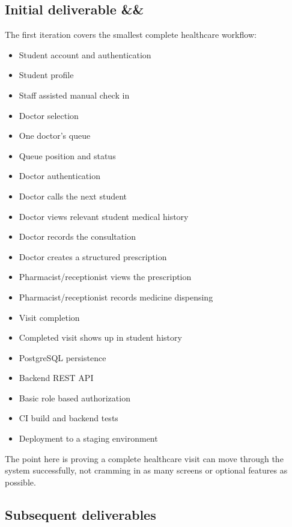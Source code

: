 \documentclass[11pt,a4paper]{article}
\newcommand{\BvrHint}[1]{%
  \ifx&#1&%
  \else
    {\normalfont\normalsize\itshape\hfill #1}%
  \fi}
\begin{document}
\subsection{Initial deliverable \BvrHint{}}

The first iteration covers the smallest complete healthcare workflow:

\begin{itemize}
    \item Student account and authentication
    \item Student profile
    \item Staff assisted manual check in
    \item Doctor selection
    \item One doctor's queue
    \item Queue position and status
    \item Doctor authentication
    \item Doctor calls the next student
    \item Doctor views relevant student medical history
    \item Doctor records the consultation
    \item Doctor creates a structured prescription
    \item Pharmacist/receptionist views the prescription
    \item Pharmacist/receptionist records medicine dispensing
    \item Visit completion
    \item Completed visit shows up in student history
    \item PostgreSQL persistence
    \item Backend REST API
    \item Basic role based authorization
    \item CI build and backend tests
    \item Deployment to a staging environment
\end{itemize}

The point here is proving a complete healthcare visit can move through the system successfully, not cramming in as many screens or optional features as possible.

\subsection{Subsequent deliverables}
\end{document}
